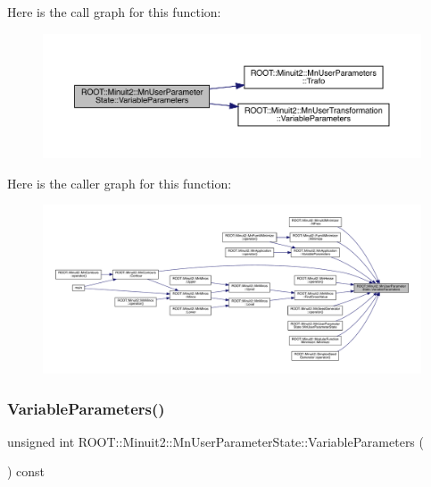 Here is the call graph for this function\+:\nopagebreak
\begin{figure}[H]
\begin{center}
\leavevmode
\includegraphics[width=350pt]{d3/de0/classROOT_1_1Minuit2_1_1MnUserParameterState_a8226cef71821d2558f31570f002631a4_cgraph}
\end{center}
\end{figure}
Here is the caller graph for this function\+:\nopagebreak
\begin{figure}[H]
\begin{center}
\leavevmode
\includegraphics[width=350pt]{d3/de0/classROOT_1_1Minuit2_1_1MnUserParameterState_a8226cef71821d2558f31570f002631a4_icgraph}
\end{center}
\end{figure}
\mbox{\label{classROOT_1_1Minuit2_1_1MnUserParameterState_a8226cef71821d2558f31570f002631a4}} 
\subsubsection{\texorpdfstring{VariableParameters()}{VariableParameters()}\hspace{0.1cm}{\footnotesize\ttfamily [2/2]}}
{\footnotesize\ttfamily unsigned int R\+O\+O\+T\+::\+Minuit2\+::\+Mn\+User\+Parameter\+State\+::\+Variable\+Parameters (\begin{DoxyParamCaption}{ }\end{DoxyParamCaption}) const}



